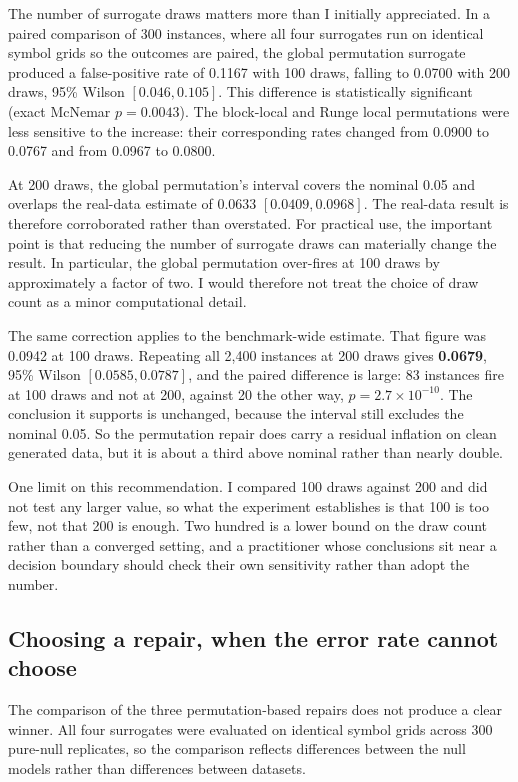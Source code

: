 \documentclass[10pt]{article}
\begin{document}
The number of surrogate draws matters more than I initially appreciated. In a paired comparison of
300 instances, where all four surrogates run on identical symbol grids so the outcomes are paired,
the global permutation surrogate produced a false-positive rate of 0.1167 with 100 draws, falling to
0.0700 with 200 draws, 95\% Wilson $[0.046, 0.105]$. This difference is statistically significant
(exact McNemar $p = 0.0043$). The block-local and Runge local permutations were less sensitive to the
increase: their corresponding rates changed from 0.0900 to 0.0767 and from 0.0967 to 0.0800.

At 200 draws, the global permutation's interval covers the nominal 0.05 and overlaps the real-data
estimate of 0.0633 $[0.0409, 0.0968]$. The real-data result is therefore corroborated rather than
overstated. For practical use, the important point is that reducing the number of surrogate draws
can materially change the result. In particular, the global permutation over-fires at 100 draws by
approximately a factor of two. I would therefore not treat the choice of draw count as a minor
computational detail.

The same correction applies to the benchmark-wide estimate. That figure was 0.0942 at 100 draws.
Repeating all 2,400 instances at 200 draws gives \textbf{0.0679}, 95\% Wilson $[0.0585, 0.0787]$,
and the paired difference is large: 83 instances fire at 100 draws and not at 200, against 20 the
other way, $p = 2.7 \times 10^{-10}$. The conclusion it supports is unchanged, because the interval
still excludes the nominal 0.05. So the permutation repair does carry a residual inflation on clean
generated data, but it is about a third above nominal rather than nearly double.

One limit on this recommendation. I compared 100 draws against 200 and did not test any larger
value, so what the experiment establishes is that 100 is too few, not that 200 is enough. Two
hundred is a lower bound on the draw count rather than a converged setting, and a practitioner whose
conclusions sit near a decision boundary should check their own sensitivity rather than adopt the
number.

\subsection{Choosing a repair, when the error rate cannot choose}

The comparison of the three permutation-based repairs does not produce a clear winner. All four
surrogates were evaluated on identical symbol grids across 300 pure-null replicates, so the
comparison reflects differences between the null models rather than differences between datasets.
\end{document}
